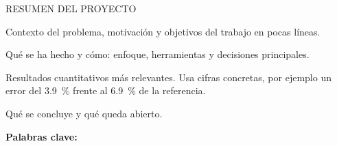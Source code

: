 \begin{resumenproyecto}{RESUMEN DEL PROYECTO}

Contexto del problema, motivación y objetivos del trabajo en pocas líneas.

Qué se ha hecho y cómo: enfoque, herramientas y decisiones principales.

Resultados cuantitativos más relevantes. Usa cifras concretas, por
ejemplo un error del \qty{3.9}{\percent} frente al \qty{6.9}{\percent}
de la referencia.

Qué se concluye y qué queda abierto.

\vspace{1em}
\noindent\textbf{Palabras clave:} \PalabrasClave

\end{resumenproyecto}
